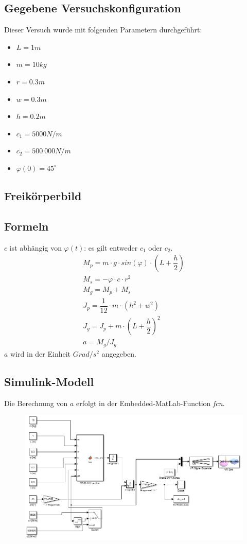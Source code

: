 \documentclass[]{scrartcl}
\begin{document}
\subsection{Gegebene Versuchskonfiguration}
Dieser Versuch wurde mit folgenden Parametern durchgeführt:
\begin{itemize}
\item $L = 1m$
\item $m = 10kg$
\item $r = 0.3m$
\item $w = 0.3m$
\item $h = 0.2m$
\item $c_{1} = 5000 N/m$
\item $c_{2} = 500\ 000N/m$
\item $\varphi(0) = 45^\circ$
\end{itemize}

\subsection{Freikörperbild}

\subsection{Formeln}
$c$ ist abhängig von $\varphi(t)$: es gilt entweder $c_{1}$ oder $c_{2}$.
\begin{align}
M_{p} = m \cdot g \cdot sin(\varphi) \cdot (L + \dfrac{h}{2})\\
M_{s} = -\varphi \cdot c \cdot r^2\\
M_{g} = M_{p} + M_{s}\\
J_{p} = \dfrac{1}{12} \cdot m \cdot (h^2 + w^2)\\
J_{g} = J_{p} + m \cdot (L + \dfrac{h}{2})^2\\
a = M_{g}/J_{g}
\end{align}
$a$ wird in der Einheit $Grad/s^2$ angegeben.

\subsection{Simulink-Modell}
Die Berechnung von $a$ erfolgt in der Embedded-MatLab-Function \textit{fcn}.

\begin{figure}[H]
\centering
\includegraphics[width=1\linewidth]{./3_Modell}
\caption{}
\label{fig:3_Modell}
\end{figure}
\end{document}
